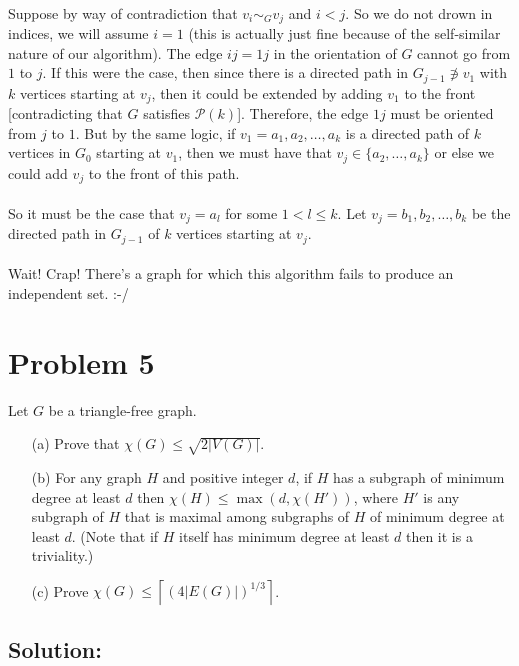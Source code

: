 \documentclass[10pt,a4paper]{article}
\newcommand{\Pee}{\mathcal{P}}
\newcommand{\ceil}[1]{\left \lceil #1 \right \rceil}
\newcommand{\1}{\mathbf{1}}
\begin{document}
{\paragraph*{}Suppose by way of contradiction that $v_i \sim_{G} v_j$ and $i < j$.  So we do not drown in indices, we will assume $i=1$ (this is actually just fine because of the self-similar nature of our algorithm).  The edge $ij=1j$ in the orientation of $G$ cannot go from $1$ to $j$.  If this were the case, then since there is a directed path in $G_{j-1} \not \ni v_1$ with $k$ vertices starting at $v_j$, then it could be extended by adding $v_1$ to the front [contradicting that $G$ satisfies $\Pee(k)$].  Therefore, the edge $1j$ must be oriented from $j$ to $1$.  But by the same logic, if $v_1 = a_1, a_2, \ldots , a_k$ is a directed path of $k$ vertices in $G_0$ starting at $v_1$, then we must have that $v_j \in \{a_2, \ldots , a_k\}$ or else we could add $v_j$ to the front of this path.
\paragraph*{}So it must be the case that $v_j = a_{l}$ for some $1 < l \leq k$.  Let $v_j = b_1, b_2, \ldots , b_k$ be the directed path in $G_{j-1}$ of $k$ vertices starting at $v_j$.

\paragraph*{}Wait!  Crap!  There's a graph for which this algorithm fails to produce an independent set.  :-/
}
\label{pr:4:end}


\section*{Problem 5}\label{pr:5:start}
Let $G$ be a triangle-free graph.
\begin{itemize}
\item[(a)] Prove that $\chi(G) \leq \sqrt{2 |V(G)|}$.
\item[(b)] For any graph $H$ and positive integer $d$, if $H$ has a subgraph of minimum degree at least $d$ then $\chi(H) \leq \max(d, \chi(H'))$, where $H'$ is any subgraph of $H$ that is maximal among subgraphs of $H$ of minimum degree at least $d$.  (Note that if $H$ itself has minimum degree at least $d$ then it is a triviality.)
\item[(c)] Prove $\chi(G) \leq \ceil{(4|E(G)|)^{1/3}}$.
\end{itemize}
\subsection*{Solution:}
\end{document}
